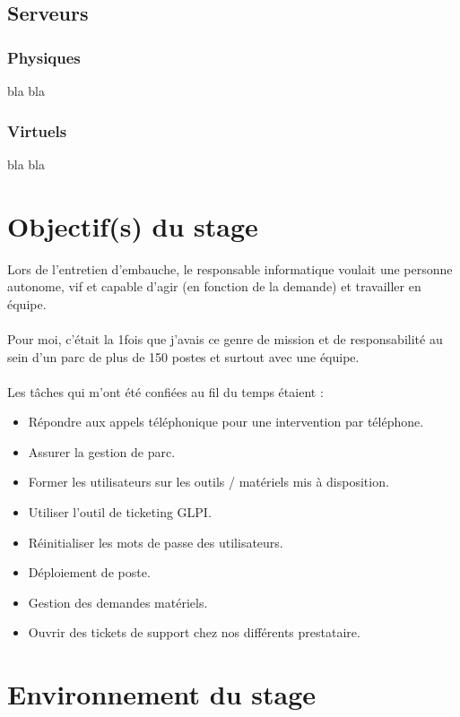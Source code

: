 \documentclass[11pt,a4paper,oneside]{article}
\begin{document}
\subsection{Serveurs}
\subsubsection{Physiques}
bla bla
\subsubsection{Virtuels}
bla bla
\newpage

\section{Objectif(s) du stage}

Lors de l'entretien d'embauche, le responsable informatique voulait une personne autonome, vif et capable d'agir (en fonction de la demande) et travailler en équipe.
\\ \\
Pour moi, c'était la 1\ier fois que j'avais ce genre de mission et de responsabilité au sein d'un parc de plus de 150 postes et surtout avec une équipe.
\\ \\
Les tâches qui m'ont été confiées au fil du temps étaient : 
\begin{itemize}
    \item Répondre aux appels téléphonique pour une intervention par téléphone.
    \item Assurer la gestion de parc.
    \item Former les utilisateurs sur les outils / matériels mis à disposition.
    \item Utiliser l'outil de ticketing GLPI.
    \item Réinitialiser les mots de passe des utilisateurs.
    \item Déploiement de poste.
    \item Gestion des demandes matériels.
    \item Ouvrir des tickets de support chez nos différents prestataire.
\end{itemize}
\newpage

\section{Environnement du stage}
\newpage
\end{document}
